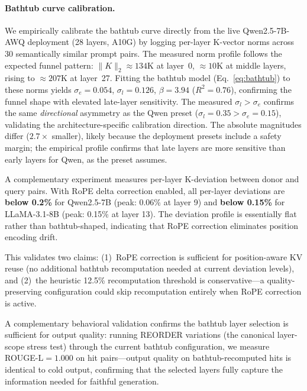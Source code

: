 \documentclass[10pt,twocolumn]{article}
\begin{document}
\paragraph{Bathtub curve calibration.}
We empirically calibrate the bathtub curve directly from the live
Qwen2.5-7B-AWQ deployment (28 layers, A10G)
by logging per-layer K-vector norms across 30 semantically similar
prompt pairs. The measured norm profile follows the expected funnel
pattern: $\|K\|_2 \approx 134\text{K}$ at layer~0,
$\approx 10\text{K}$ at middle layers, rising to $\approx 207\text{K}$
at layer~27. Fitting the bathtub model (Eq.~\ref{eq:bathtub}) to
these norms yields $\sigma_e{=}0.054$, $\sigma_l{=}0.126$,
$\beta{=}3.94$ ($R^2{=}0.76$), confirming the funnel shape with
elevated late-layer sensitivity. The measured $\sigma_l {>} \sigma_e$
confirms the same \emph{directional} asymmetry as the Qwen preset
($\sigma_l{=}0.35 {>} \sigma_e{=}0.15$), validating the
architecture-specific calibration direction. The absolute magnitudes
differ ($2.7\times$ smaller), likely because the deployment presets
include a safety margin; the empirical profile confirms that late
layers are more sensitive than early layers for Qwen, as the preset
assumes.

A complementary experiment measures per-layer K-deviation between
donor and query pairs. With RoPE delta correction enabled, all
per-layer deviations are \textbf{below 0.2\%} for Qwen2.5-7B (peak:
0.06\% at layer 9) and \textbf{below 0.15\%} for LLaMA-3.1-8B
(peak: 0.15\% at layer 13). The deviation profile is essentially flat
rather than bathtub-shaped, indicating that RoPE correction eliminates
position encoding drift.

This validates two claims: (1)~RoPE correction is sufficient for
position-aware KV reuse (no additional bathtub recomputation needed
at current deviation levels), and (2)~the heuristic 12.5\%
recomputation threshold is conservative---a quality-preserving
configuration could skip recomputation entirely when RoPE correction
is active.

A complementary behavioral validation confirms the bathtub layer
selection is sufficient for output quality: running REORDER
variations (the canonical layer-scope stress test) through the
current bathtub configuration, we measure ROUGE-L$=1.000$ on hit
pairs---output quality on bathtub-recomputed hits is identical to
cold output, confirming that the selected layers fully capture the
information needed for faithful generation.
\end{document}

